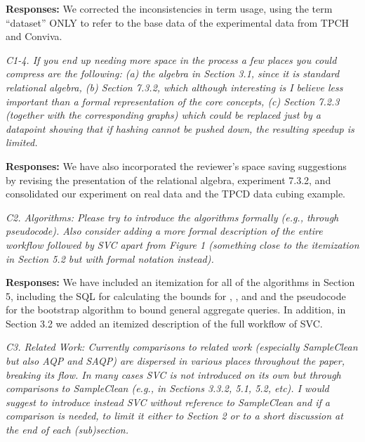 \vspace{.25em}

{\bf Responses:} We corrected the inconsistencies in term usage, using the term “dataset” ONLY to refer to the base data of the experimental data from TPCH and Conviva. 

\vspace{1em}
\emph{C1-4. If you end up needing more space in the process a few places you could compress are the following: (a) the algebra in Section 3.1, since it is standard relational algebra, (b) Section 7.3.2, which although interesting is I believe less important than a formal representation of the core concepts, (c) Section 7.2.3 (together with the corresponding graphs) which could be replaced just by a datapoint showing that if hashing cannot be pushed down, the resulting speedup is limited.}

\vspace{.25em}

{\bf Responses:} We have also incorporated the reviewer’s space saving suggestions by revising the presentation of the relational algebra, experiment 7.3.2, and consolidated our experiment on real data and the TPCD data cubing example.

\vspace{1em}
\emph{C2. Algorithms: Please try to introduce the algorithms formally (e.g., through pseudocode). Also consider adding a more formal description of the entire workflow followed by SVC apart from Figure 1 (something close to the itemization in Section 5.2 but with formal notation instead).}

\vspace{.25em}

{\bf Responses:} We have included an itemization for all of the algorithms in Section 5, including the SQL for calculating the bounds for \sumfunc, \avgfunc, and \countfunc and the pseudocode for the bootstrap algorithm to bound general aggregate queries. In addition, in Section 3.2 we added an itemized description of the full workflow of SVC.

\vspace{1em}
\emph{C3. Related Work: Currently comparisons to related work (especially SampleClean but also AQP and SAQP) are dispersed in various places throughout the paper, breaking its flow. In many cases SVC is not introduced on its own but through comparisons to SampleClean (e.g., in Sections 3.3.2, 5.1, 5.2, etc). I would suggest to introduce instead SVC without reference to SampleClean and if a comparison is needed, to limit it either to Section 2 or to a short discussion at the end of each (sub)section.}

